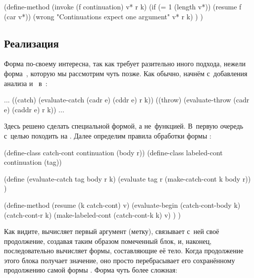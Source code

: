\begin{code:lisp}
(define-method (invoke (f continuation) v* r k)
  (if (= 1 (length v*))
      (resume f (car v*))
      (wrong "Continuations expect one argument" v* r k) ) )
\end{code:lisp}


\subsection{\texorpdfstring{Реализация \protect{}}{Реализация catch}}%
\label{escape/implementation/ssect:catch}

Форма  по-своему интересна, так как требует разительно иного подхода,
нежели форма~, которую мы рассмотрим чуть позже. Как обычно, начнём
с~добавления анализа  и~ в~:

\begin{code:lisp}
...
((catch) (evaluate-catch (cadr e) (cddr e) r k))
((throw) (evaluate-throw (cadr e) (caddr e) r k))
...
\end{code:lisp}

Здесь решено сделать  специальной формой, а не~функцией. В~первую
очередь с~целью походить на {\CommonLisp}. Далее определим правила обработки
формы :

\begin{code:lisp}
(define-class catch-cont   continuation (body r))
(define-class labeled-cont continuation (tag))

(define (evaluate-catch tag body r k)
  (evaluate tag r (make-catch-cont k body r)) )

(define-method (resume (k catch-cont) v)
  (evaluate-begin (catch-cont-body k)
                  (catch-cont-r k)
                  (make-labeled-cont (catch-cont-k k) v) ) )
\end{code:lisp}

Как видите,  вычисляет первый аргумент (метку), связывает с~ней своё
продолжение, создавая таким образом помеченный блок, и, наконец, последовательно
вычисляет формы, составляющие её тело. Когда продолжение этого блока получает
значение, оно просто перебрасывает его сохранённому продолжению самой формы
. Форма  чуть более сложная:

